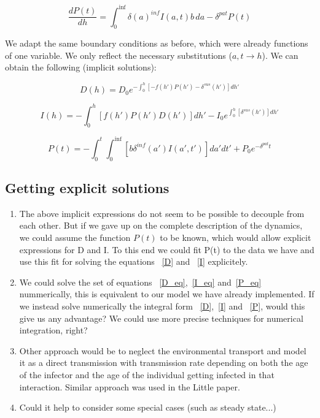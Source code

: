 \documentclass[10pt]{article}         %
\begin{document}
\begin{equation}
\frac{dP(t)}{dh}= \int_{0}^{\inf} \delta(a)^{inf} I(a,t)b \, da - \delta^{pat}P(t)
\end{equation}

We adapt the same boundary conditions as before, which were already functions of one variable. We only reflect the necessary substitutions ($a,t \rightarrow h$).\newline
We can obtain the following (implicit solutions):

\begin{equation}
\label{D}
D(h) = D_0e^{-\int_0^{h}[-f(h')P(h') - \delta^{sus}(h')]dh'}
\end{equation}

\begin{equation}
\label{I}
I(h) = -\int_0^{h}[f(h')P(h')D(h')]dh' - I_0 e^{\int_0^{h}[\delta^{sus}(h')]dh'}
\end{equation}

\begin{equation}
\label{P}
P(t) = -\int_0^{t}\int_0^{\inf}[b\delta^{inf}(a')I(a',t')]da' dt' + P_0 e^{-\delta^{pat}t }
\end{equation}

\subsection{Getting explicit solutions}
\begin{enumerate}
\item The above implicit expressions do not seem to be possible to decouple from each other. But if we gave up on the complete description of the dynamics, we could assume the function $P(t)$ to be known, which would allow explicit expressions for D and I. To this end we could fit P(t) to the data we have and use this fit for solving the equations ~\ref{D} and ~\ref{I} explicitely.
\item We could solve the set of equations ~\ref{D_eq},~\ref{I_eq} and~\ref{P_eq} nummerically, this is equivalent to our model we have already implemented. If we instead solve numerically the integral form ~\ref{D},~\ref{I} and ~\ref{P}, would this give us any advantage? We could use more precise techniques for numerical integration, right?
\item Other approach would be to neglect the environmental transport and model it as a direct transmission with transmission rate depending on both the age of the infector and the age of the individual getting infected in that interaction. Similar approach was used in the Little paper. 
\item Could it help to consider some special cases (such as steady state...)
\end{enumerate}
\end{document}
